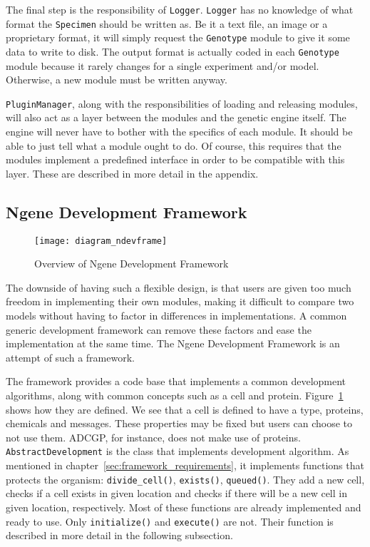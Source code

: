 The final step is the responsibility of \texttt{Logger}. \texttt{Logger} has no knowledge of what format the \texttt{Specimen} should be written as. Be it a text file, an image or a proprietary format, it will simply request the \texttt{Genotype} module to give it some data to write to disk. The output format is actually coded in each \texttt{Genotype} module because it rarely changes for a single experiment and/or model. Otherwise, a new module must be written anyway.

\texttt{PluginManager}, along with the responsibilities of loading and releasing modules, will also act as a layer between the modules and the genetic engine itself. The engine will never have to bother with the specifics of each module. It should be able to just tell what a module ought to do. Of course, this requires that the modules implement a predefined interface in order to be compatible with this layer. These are described in more detail in the appendix.


\subsection{Ngene Development Framework}
\begin{figure}[!ht]
	\centering
	\texttt{[image: diagram\_ndevframe]}
	\caption{Overview of Ngene Development Framework}
	\label{fig:diagram_ndevframe}
\end{figure}

The downside of having such a flexible design, is that users are given too much freedom in implementing their own modules, making it difficult to compare two models without having to factor in differences in implementations. A common generic development framework can remove these factors and ease the implementation at the same time. The Ngene Development Framework is an attempt of such a framework.

The framework provides a code base that implements a common development algorithms, along with common concepts such as a cell and protein. Figure~\ref{fig:diagram_ndevframe} shows how they are defined. We see that a cell is defined to have a type, proteins, chemicals and messages. These properties may be fixed but users can choose to not use them. ADCGP, for instance, does not make use of proteins. \texttt{AbstractDevelopment} is the class that implements development algorithm. As mentioned in chapter~\ref{sec:framework_requirements}, it implements functions that protects the organism: \texttt{divide\_cell()}, \texttt{exists()}, \texttt{queued()}. They add a new cell, checks if a cell exists in given location and checks if there will be a new cell in given location, respectively. Most of these functions are already implemented and ready to use. Only \texttt{initialize()} and \texttt{execute()} are not. Their function is described in more detail in the following subsection.

